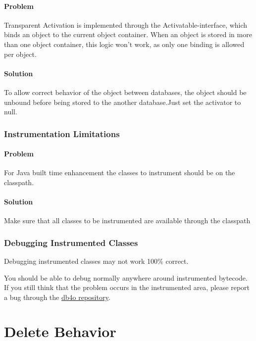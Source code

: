 \paragraph*{Problem}

Transparent Activation is implemented through the Activatable-interface, which binds an object to the current object container. When an object is stored in more than one object container, this logic won't work, as only one binding is allowed per object.

\paragraph*{Solution}

To allow correct behavior of the object between databases, the object should be unbound before being stored to the another database.Just set the activator to null.

\subsubsection*{Instrumentation Limitations}

\paragraph*{Problem}

For Java built time enhancement the classes to instrument should be on the classpath.

\paragraph*{Solution}

Make sure that all classes to be instrumented are available through the classpath

\subsubsection*{Debugging Instrumented Classes}

Debugging instrumented classes may not work 100\% correct.

You should be able to debug normally anywhere around instrumented bytecode. If you still think that the problem occurs in the instrumented area, please report a bug through the \href{https://github.com/blakemcbride/db4o}{db4o repository}.

\section{Delete Behavior}
\label{ref:basics-delete-behavior}

